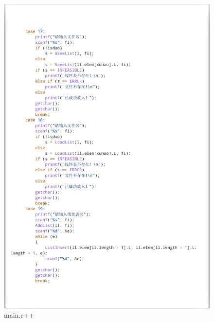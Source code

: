 \documentclass[supercite]{Experimental_Report}
\theoremstyle{definition}
\begin{document}
\begin{figure}[htb]
	\begin{center}
		\includegraphics[scale=0.30]{images/3-15.png}
		\caption{main.c++}
		\label{fig3-15}
	\end{center}
\end{figure}
\end{document}
